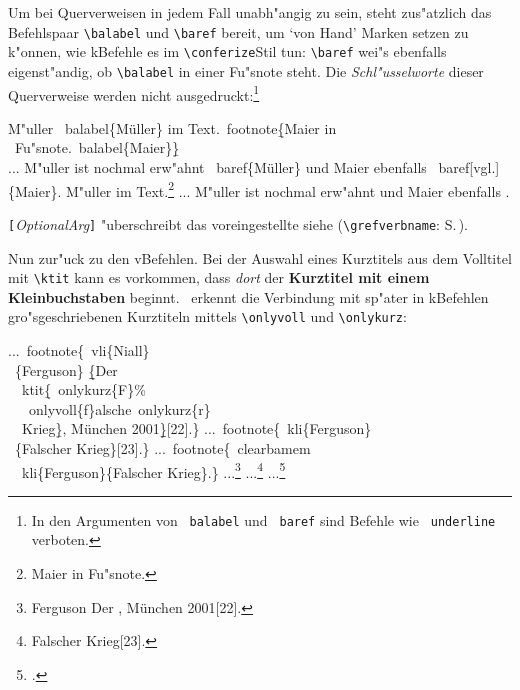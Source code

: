 \documentclass[12pt,a4paper]{article}
\newcommand{\pbs}{\string\ \unskip}
\newcommand{\bs}{\protect\pbs}
\begin{document}
Um bei Querverweisen in jedem Fall unabh"angig zu sein, steht zus"atzlich 
das Befehlspaar \verb|\balabel| und \verb|\baref| bereit, um `von Hand' 
Marken setzen zu k"onnen, wie k\fhy Befehle es im \hspace{-.075em}\verb|\conferize|\hy Stil 
tun: \hspace{.05em}\verb|\baref| wei"s ebenfalls eigenst"andig, ob 
\verb|\balabel| in einer Fu"snote steht. Die \textit{Schl"usselworte} 
dieser Querverweise werden nicht ausgedruckt:\footnote{In den 
Argumenten von \texttt{\bs balabel} und \texttt{\bs baref} sind
Befehle wie \texttt{\bs underline} \hspace{.05em}verboten.}

\vspace{-.5ex}
\Doppelbox
{\vspace{.125ex}
 M"uller \bs balabel\{Müller\} im 
 Text.\bs footnote\b{\{}Maier in 
 \\ \ Fu"snote.\bs balabel\{Maier\}\b{\}}
 \\ ... M"uller ist nochmal erw"ahnt \bs baref\{Müller\} 
 und Maier ebenfalls \bs baref[vgl.]\{Maier\}.
}
{M"uller  im 
 Text.\footnote{Maier in 
 Fu"snote.}
 ... M"uller ist nochmal erw"ahnt  
 und Maier ebenfalls .
}

\vspace{-.25ex}\noindent
\texttt{[}\textit{OptionalArg}\texttt{]} "uberschreibt das voreingestellte \textsf{siehe}
(\verb|\grefverbname|: S.\,\pageref{grefverbname}). 


\vspace{1.5ex}\noindent
Nun zur"uck zu den v\fhy Befehlen. Bei der Auswahl eines Kurztitels aus
dem Volltitel mit \verb|\ktit| kann es vorkommen, dass 
\textit{dort} der \textbf{Kurztitel mit einem Kleinbuchstaben} beginnt. \BibArts\
erkennt die Verbindung mit sp"ater in k\fhy Befehlen gro"sgeschriebenen 
Kurztiteln mittels \hspace{-.05em}\verb|\onlyvoll| und \verb|\onlykurz|:

\vspace{-.325ex}
\label{Ferguson}%
\Doppelbox
{\vspace{.75ex}
  ...\bs footnote\{\bs vli\{Niall\}
  \\ \ \{Ferguson\} \b{\b{\{}}Der
  \\ \ \bs ktit\b{\{}\bs onlykurz\{F\}\%
  \\ \ \ \bs onlyvoll\{f\}alsche\bs onlykurz\{r\} 
  \\ \ \ Krieg\b{\}}, München 2001\b{\b{\}}}[22].\}
 ...\bs footnote\{\bs kli\{Ferguson\}
   \\ \ \{Falscher Krieg\}[23].\}
 ...\bs footnote\{\bs clearbamem 
 \\ \ \bs kli\{Ferguson\}\{Falscher Krieg\}.\}%
 \vspace{.5ex}
}
{...\footnote{
      {Ferguson} {Der
     ,
            München 2001}[22].}
 ...\footnote{
      {Falscher Krieg}[23].}
 ...\footnote{\clearbamem {}.\label{clearbamem}} 
}
\end{document}
